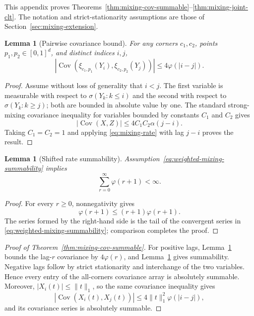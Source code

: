 \documentclass[pdflatex]{sn-jnl}
\theoremstyle{thmstyleone}
\newtheorem{lemma}[theorem]{Lemma}
\theoremstyle{thmstyletwo}
\theoremstyle{thmstylethree}
\DeclareMathOperator{\Cov}{Cov}
\begin{document}
\begin{appendices}
This appendix proves Theorems~\ref{thm:mixing-cov-summable}--\ref{thm:mixing-joint-clt}. The notation and strict-stationarity assumptions are those of Section~\ref{sec:mixing-extension}.

\begin{lemma}[Pairwise covariance bound]\label{lem:mixing-cov-bound}
For any corners $c_1,c_2$, points $p_1,p_2\in[0,1]^d$, and distinct indices $i,j$,
\[
  \left|\Cov\!\left(\xi_{c_1,p_1}(Y_i),\xi_{c_2,p_2}(Y_j)\right)\right|
  \le 4\varphi(|i-j|).
\]
\end{lemma}

\begin{proof}
Assume without loss of generality that $i<j$. The first variable is measurable with respect to $\sigma(Y_k:k\le i)$ and the second with respect to $\sigma(Y_k:k\ge j)$; both are bounded in absolute value by one. The standard strong-mixing covariance inequality for variables bounded by constants $C_1$ and $C_2$ gives \cite{Doukhan1994,Bradley2005,Rio2017}
\[
  |\Cov(X,Z)|\le4C_1C_2\alpha(j-i).
\]
Taking $C_1=C_2=1$ and applying \eqref{eq:mixing-rate} with lag $j-i$ proves the result.
\end{proof}

\begin{lemma}[Shifted rate summability]\label{lem:mixing-rate-summable}
Assumption~\eqref{eq:weighted-mixing-summability} implies
\[
  \sum_{r=0}^{\infty}\varphi(r+1)<\infty.
\]
\end{lemma}

\begin{proof}
For every $r\ge0$, nonnegativity gives
\[
  \varphi(r+1)\le(r+1)\varphi(r+1).
\]
The series formed by the right-hand side is the tail of the convergent series in \eqref{eq:weighted-mixing-summability}; comparison completes the proof.
\end{proof}

\begin{proof}[Proof of Theorem~\ref{thm:mixing-cov-summable}]
For positive lags, Lemma~\ref{lem:mixing-cov-bound} bounds the lag-$r$ covariance by $4\varphi(r)$, and Lemma~\ref{lem:mixing-rate-summable} gives summability. Negative lags follow by strict stationarity and interchange of the two variables. Hence every entry of the all-corners covariance array is absolutely summable. Moreover, $|X_i(t)|\le\|t\|_1$, so the same covariance inequality gives
\[
  |\Cov(X_i(t),X_j(t))|
  \le4\|t\|_1^2\varphi(|i-j|),
\]
and its covariance series is absolutely summable.
\end{proof}


\end{appendices}
\end{document}
